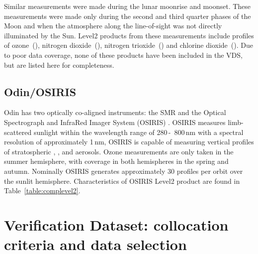 Similar measurements were made during the lunar moonrise and moonset.  These
measurements were made only during the second and third quarter phases of
the Moon and when the atmosphere along the line-of-sight was not directly
illuminated by the Sun.  Level2 products from these measurements include
profiles of ozone~(), nitrogen dioxide~(), nitrogen
trioxide~() and chlorine dioxide~().  Due to poor data
coverage, none of these products have been included in the VDS, but are
listed here for completeness.

\subsection{Odin/OSIRIS}

Odin has two optically co-aligned instruments: the SMR 
and the Optical Spectrograph and InfraRed Imager System (OSIRIS)
\citep{llewellyn:osiris:04}. OSIRIS
measures limb-scattered sunlight within the wavelength range of 280\,-\,
800\,nm with a spectral resolution of approximately 1\,nm,
OSIRIS is capable of measuring vertical profiles of stratospheric 
, , and aerosols. 
Ozone measurements are only taken in the
summer hemisphere, with coverage in both hemispheres in
the spring and autumn.
Nominally OSIRIS generates approximately 30
 profiles per orbit over the sunlit hemisphere.
Characteristics of OSIRIS Level2  product
are found in Table~\ref{table:complevel2}.



\section{Verification Dataset: collocation criteria and data selection}
\label{sec:vdsselection}

